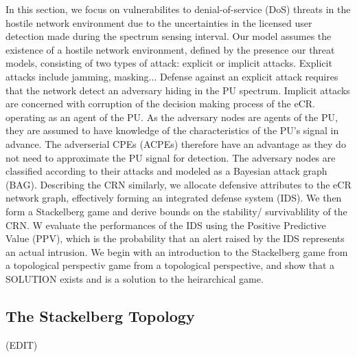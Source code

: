 \documentclass[10pt]{article}
\theoremstyle{definition}
\begin{document}
In this section, we focus on vulnerabilites to denial-of-service (DoS) threats in the hostile network environment due to the uncertainties in the licensed user detection made during the spectrum sensing interval.
Our model assumes the existence of a hostile network environment, defined by the
presence our threat models, consisting of two types of attack: explicit or
implicit attacks. Explicit attacks include jamming, masking... Defense against
an explicit attack requires that the network detect an adversary hiding in the
PU spectrum. Implicit attacks are concerned with corruption of the decision
making process of the eCR. 
operating as an agent of the PU. As the adversary nodes are agents of the PU,
they are assumed to have knowledge of the characteristics of the PU's signal in
advance. The adverserial CPEs (ACPEs) therefore have an advantage as they do not
need to approximate the PU signal for detection. The adversary nodes are
classified according to their attacks and modeled as a Bayesian attack graph
(BAG). Describing the CRN similarly, we allocate defensive attributes to the eCR network graph, effectively forming an integrated defense system (IDS). We then form a Stackelberg game and derive bounds on the stability/ survivablility of the CRN.
W evaluate the performances of the IDS using the Positive Predictive Value (PPV), which is the probability that an alert raised by the IDS represents an actual intrusion. 
We begin with an introduction to the Stackelberg game from a topological
perspectiv game from a topological perspective, and show that a SOLUTION exists
and is a solution to the heirarchical game.

\subsection{The Stackelberg Topology}

(EDIT)
\end{document}
